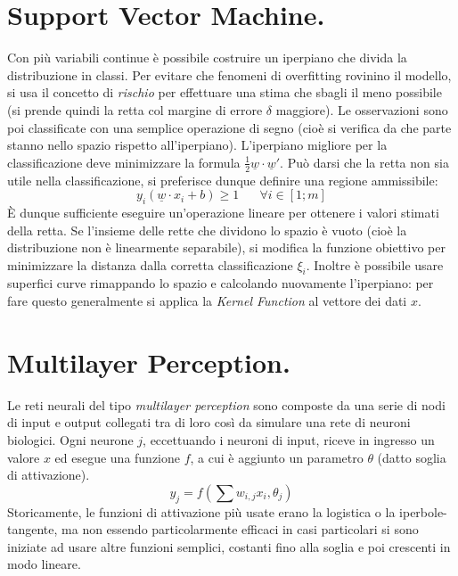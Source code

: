 \documentclass[11pt, a4page, twocolumn]{article}
\begin{document}
\section{Support Vector Machine.}
Con più variabili continue è possibile costruire un iperpiano che divida la distribuzione in classi.
Per evitare che fenomeni di overfitting rovinino il modello, si usa il concetto di \textit{rischio} per effettuare una stima che sbagli il meno possibile (si prende quindi la retta col margine di errore $\delta$ maggiore).
Le osservazioni sono poi classificate con una semplice operazione di segno (cioè si verifica da che parte stanno nello spazio rispetto all'iperpiano).
L'iperpiano migliore per la classificazione deve minimizzare la formula $\frac{1}{2} \underline{w} \cdot \underline{w}'$.
Può darsi che la retta non sia utile nella classificazione, si preferisce dunque definire una regione ammissibile:
\begin{equation*}
  y_i (\underline{w} \cdot x_i + b) \ge 1 \hspace{20pt} \forall i \in [1; m]
\end{equation*}
È dunque sufficiente eseguire un'operazione lineare per ottenere i valori stimati della retta.
Se l'insieme delle rette che dividono lo spazio è vuoto (cioè la distribuzione non è linearmente separabile), si modifica la funzione obiettivo per minimizzare la distanza dalla corretta classificazione $\xi_i$.
Inoltre è possibile usare superfici curve rimappando lo spazio e calcolando nuovamente l'iperpiano: per fare questo generalmente si applica la \textit{Kernel Function} al vettore dei dati $x$.


\section{Multilayer Perception.}
Le reti neurali del tipo \textit{multilayer perception} sono composte da una serie di nodi di input e output collegati tra di loro così da simulare una rete di neuroni biologici.
Ogni neurone $j$, eccettuando i neuroni di input, riceve in ingresso un valore $x$ ed esegue una funzione $f$, a cui è aggiunto un parametro $\theta$ (datto soglia di attivazione).
\begin{equation*}
  y_j = f( \sum{}{}{w_{i,j} x_i, \theta_j})
\end{equation*}
Storicamente, le funzioni di attivazione più usate erano la logistica o la iperbole-tangente, ma non essendo particolarmente efficaci in casi particolari si sono iniziate ad usare altre funzioni semplici, costanti fino alla soglia e poi crescenti in modo lineare.
\end{document}
